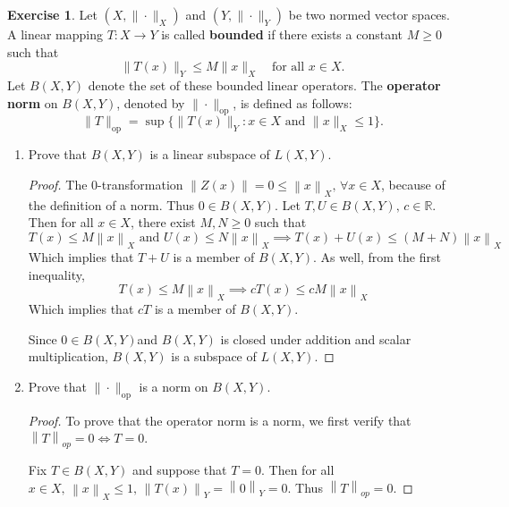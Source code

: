 \documentclass{article}
\theoremstyle{plain} %
\numberwithin{thm}{section} %
\theoremstyle{definition}
\newtheorem{exercise}[thm]{Exercise} %
\begin{document}
    \begin{exercise}
        Let $(X,\|\cdot\|_X)$ and $(Y,\|\cdot\|_Y)$ be two normed vector spaces. A linear mapping $T:X\rightarrow Y$ is called \textbf{bounded} if there exists a constant $M\geq 0$ such that
        \[ \|T(x)\|_Y \leq M \|x\|_X \quad \text{for all $x\in X$.}  \]
        Let $B(X,Y)$ denote the set of these bounded linear operators. The \textbf{operator norm} on $B(X,Y)$, denoted by $\|\cdot\|_{\mathrm{op}}$, is defined as follows:
            \[ \|T\|_{\mathrm{op}} = \sup\{ \|T(x)\|_Y : x\in X \text{ and } \|x\|_X\leq 1 \}. \]
        \begin{enumerate}[label=(\alph*)]
            \item Prove that $B(X,Y)$ is a linear subspace of $L(X,Y)$.
            
            \begin{proof}
                The 0-transformation \(\left\lVert Z(x) \right\rVert  = 0 \leq \left\lVert x \right\rVert _X \text{, } \forall x \in X\), because of the definition of a norm. Thus \(0 \in B(X,Y)\).
                Let \(T, U \in B(X,Y) \text{, } c \in \mathbb{R}\). Then for all \(x \in X\), there exist \(M, N \geq 0\) such that
                \[
                    T(x) \leq M \left\lVert x \right\rVert _X \text{ and } U(x) \leq N \left\lVert x \right\rVert _X \implies T(x) + U(x) \leq (M+N) \left\lVert x \right\rVert _X
                \] 
                Which implies that \(T+U\) is a member of \(B(X,Y)\). As well, from the first inequality,
                \[
                    T(x) \leq M \left\lVert x \right\rVert _X \implies cT(x) \leq  cM \left\lVert x \right\rVert _X
                \]
                Which implies that \(cT\) is a member of \(B(X,Y)\).

                Since \(0 \in B(X,Y)\)and \(B(X,Y)\) is closed under addition and scalar multiplication, \(B(X,Y)\) is a subspace of \(L(X,Y)\).

            \end{proof}
            \item Prove that $\|\cdot\|_{\mathrm{op}}$ is a norm on $B(X,Y)$.
        
            \begin{proof}
                To prove that the operator norm is a norm, we first verify that \(\left\lVert T \right\rVert _{op} = 0 \iff T = 0\).

                Fix \(T \in B(X,Y)\) and suppose that \(T = 0\). Then for all \(x \in X \text{, } \left\lVert x \right\rVert _X \leq 1 \text{, } \left\lVert T(x) \right\rVert _Y = \left\lVert 0 \right\rVert _Y = 0\). Thus \(\left\lVert T \right\rVert _{op} = 0\).  
                

\end{proof}
\end{enumerate}
\end{exercise}
\end{document}
